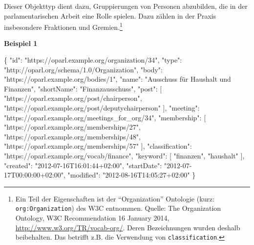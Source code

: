 \documentclass[,a4paper]{article}
\newenvironment{Shaded}{}{}
\newcommand{\DataTypeTok}[1]{\textcolor[rgb]{0.56,0.13,0.00}{{#1}}}
\newcommand{\StringTok}[1]{\textcolor[rgb]{0.25,0.44,0.63}{{#1}}}
\newcommand{\OtherTok}[1]{\textcolor[rgb]{0.00,0.44,0.13}{{#1}}}
\newcommand{\FunctionTok}[1]{\textcolor[rgb]{0.02,0.16,0.49}{{#1}}}
\begin{document}
Dieser Objekttyp dient dazu, Gruppierungen von Personen abzubilden, die
in der parlamentarischen Arbeit eine Rolle spielen. Dazu zählen in der
Praxis insbesondere Fraktionen und Gremien.\footnote{Ein Teil der
  Eigenschaften ist der ``Organization'' Ontologie (kurz:
  \texttt{org:Organization}) des W3C entnommen. Quelle: The Organization
  Ontology, W3C Recommendation 16 January 2014,
  \url{http://www.w3.org/TR/vocab-org/}. Deren Bezeichnungen wurden
  deshalb beibehalten. Das betrifft z.B. die Verwendung von
  \texttt{classification}.}

\textbf{Beispiel 1}

\begin{Shaded}
\begin{Highlighting}[]
\FunctionTok{\{}
    \DataTypeTok{"id"}\FunctionTok{:} \StringTok{"https://oparl.example.org/organization/34"}\FunctionTok{,}
    \DataTypeTok{"type"}\FunctionTok{:} \StringTok{"http://oparl.org/schema/1.0/Organization"}\FunctionTok{,}
    \DataTypeTok{"body"}\FunctionTok{:} \StringTok{"https://oparl.example.org/bodies/1"}\FunctionTok{,}
    \DataTypeTok{"name"}\FunctionTok{:} \StringTok{"Ausschuss für Haushalt und Finanzen"}\FunctionTok{,}
    \DataTypeTok{"shortName"}\FunctionTok{:} \StringTok{"Finanzausschuss"}\FunctionTok{,}
    \DataTypeTok{"post"}\FunctionTok{:} \OtherTok{[}
        \StringTok{"https://oparl.example.org/post/chairperson"}\OtherTok{,}
        \StringTok{"https://oparl.example.org/post/deputychairperson"}
    \OtherTok{]}\FunctionTok{,}
    \DataTypeTok{"meeting"}\FunctionTok{:} \StringTok{"https://oparl.example.org/meetings_for_org/34"}\FunctionTok{,}
    \DataTypeTok{"membership"}\FunctionTok{:} \OtherTok{[}
        \StringTok{"https://oparl.example.org/memberships/27"}\OtherTok{,}
        \StringTok{"https://oparl.example.org/memberships/48"}\OtherTok{,}
        \StringTok{"https://oparl.example.org/memberships/57"}
    \OtherTok{]}\FunctionTok{,}
    \DataTypeTok{"classification"}\FunctionTok{:} \StringTok{"https://oparl.example.org/vocab/finance"}\FunctionTok{,}
    \DataTypeTok{"keyword"}\FunctionTok{:} \OtherTok{[}
        \StringTok{"finanzen"}\OtherTok{,}
        \StringTok{"haushalt"}
    \OtherTok{]}\FunctionTok{,}
    \DataTypeTok{"created"}\FunctionTok{:} \StringTok{"2012-07-16T16:01:44+02:00"}\FunctionTok{,}
    \DataTypeTok{"startDate"}\FunctionTok{:} \StringTok{"2012-07-17T00:00:00+02:00"}\FunctionTok{,}
    \DataTypeTok{"modified"}\FunctionTok{:} \StringTok{"2012-08-16T14:05:27+02:00"}
\FunctionTok{\}}
\end{Highlighting}
\end{Shaded}
\end{document}
